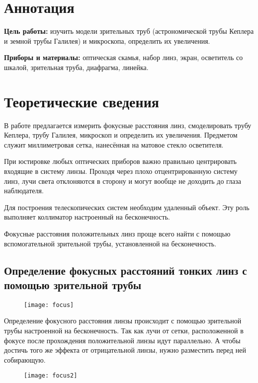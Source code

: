 





\section{Аннотация}
\textbf{Цель работы:} изучить модели зрительных труб (астрономической
трубы Кеплера и земной трубы Галилея) и микроскопа, определить
их увеличения.

\textbf{Приборы и материалы:} оптическая скамья, набор линз, экран,
осветитель со шкалой, зрительная труба, диафрагма, линейка.

\section{Теоретические сведения}
	
	В работе предлагается измерить фокусные расстояния линз, смоделировать трубу Кеплера, трубу Галилея, микроскоп и определить их увеличения. Предметом служит миллиметровая сетка, нанесённая на матовое стекло осветителя.
	
	При юстировке любых оптических приборов важно правильно центрировать входящие в систему линзы. Проходя через плохо отцентрированную систему линз, лучи света отклоняются в сторону и могут вообще не доходить до глаза наблюдателя.
	
	Для построения телескопических систем необходим удаленный объект. Эту роль выполняет коллиматор настроенный на бесконечность.
	
	Фокусные расстояния положительных линз проще всего найти с помощью вспомогательной зрительной трубы, установленной на бесконечность. 
	
	\subsection{Определение фокусных расстояний тонких линз с помощью
		зрительной трубы}
	\begin{figure}[H]
		\centering
		\texttt{[image: focus]}
	\end{figure}

	Определение фокусного расстояния линзы происходит с помощью зрительной трубы настроенной на бесконечность. Так как лучи от сетки, расположенной в фокусе после прохождения положительной линзы идут параллельно. А чтобы достичь того же эффекта от отрицательной линзы, нужно разместить перед ней собирающую.
	
	\begin{figure}[H]
		\centering
		\texttt{[image: focus2]}
	\end{figure}

